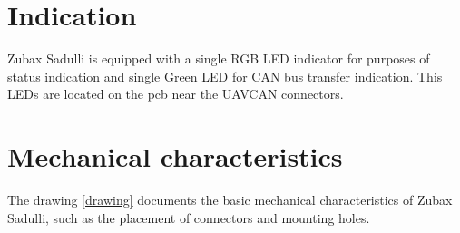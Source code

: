 \documentclass{zubaxdoc}
\begin{document}
\section{Indication}

Zubax Sadulli is equipped with a single RGB LED indicator for purposes of status indication and single Green LED for CAN bus transfer indication. 
This LEDs are located on the pcb near the UAVCAN connectors.

\section{Mechanical characteristics}

The drawing \ref{drawing} documents the basic mechanical characteristics of Zubax Sadulli,
such as the placement of connectors and mounting holes.
\end{document}
